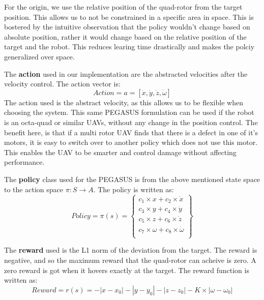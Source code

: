 \documentclass[BTech]{iitmdiss}
\begin{document}
For the origin, we use the relative position of the quad-rotor from the target position. This allows us to not be constrained in a specific area in space. This is bostered by the intuitive observation that the policy wouldn't change based on absolute position, rather it would change based on the relative position of the target and the robot. This reduces learing time drastically and makes the polciy generalized over space.

The {\bf action} used in our implementation are the abstracted velocities after the velocity control. The action vector is:
\begin{equation}
  Action = a = [\dot{x}, \dot{y}, \dot{z}, \dot{\omega}]
\end{equation}
The action used is the abstract velocity, as this allows us to be flexible when choosing the system. This same PEGASUS formulation can be used if the robot is an octa-quad or similar UAVs, without any change in the position control. The benefit here, is that if a multi rotor UAV finds that there is a defect in one of it's motors, it is easy to switch over to another policy which does not use this motor. This enables the UAV to be smarter and control damage without affecting performance.

The {\bf policy} class used for the PEGASUS is from the above mentioned state space to the action space $\pi: S \rightarrow A$. The policy is written as:
\begin{equation}
  Policy = \pi(s) = \left\{
    \begin{array}{c}
      c_1 \times x + c_2 \times \dot{x} \\
      c_3 \times y + c_4 \times \dot{y} \\
      c_5 \times z + c_6 \times \dot{z} \\
      c_7 \times \omega + c_8 \times \dot{\omega} \\
    \end{array}
  \right\}
\end{equation}


The {\bf reward} used is the L1 norm of the deviation from the target. The reward is negative, and so the maximum reward that the quad-rotor can acheive is zero. A zero reward is got when it hovers exactly at the target. The reward function is written as:
\begin{equation}
  Reward = r(s) = - |x - x_0| - |y - y_0| - |z - z_0| - K \times |\omega - \omega_0|
\end{equation}
\end{document}
